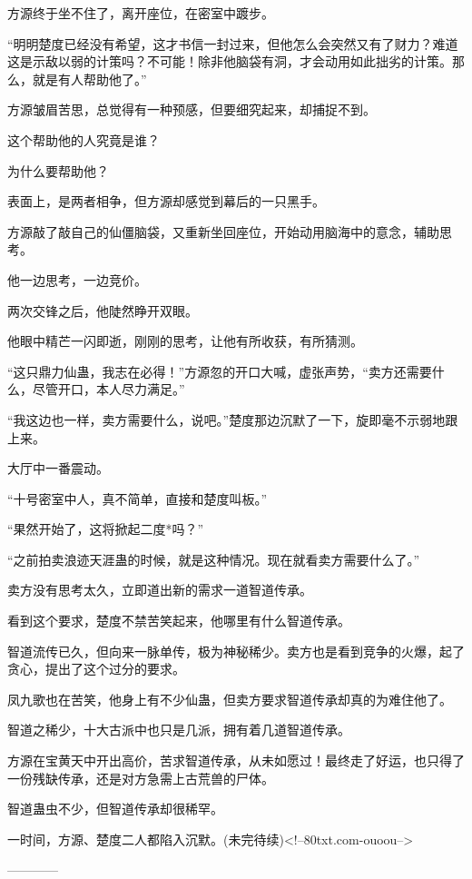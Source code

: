 \begin{this_body}
方源终于坐不住了，离开座位，在密室中踱步。

“明明楚度已经没有希望，这才书信一封过来，但他怎么会突然又有了财力？难道这是示敌以弱的计策吗？不可能！除非他脑袋有洞，才会动用如此拙劣的计策。那么，就是有人帮助他了。”

方源皱眉苦思，总觉得有一种预感，但要细究起来，却捕捉不到。

这个帮助他的人究竟是谁？

为什么要帮助他？

表面上，是两者相争，但方源却感觉到幕后的一只黑手。

方源敲了敲自己的仙僵脑袋，又重新坐回座位，开始动用脑海中的意念，辅助思考。

他一边思考，一边竞价。

两次交锋之后，他陡然睁开双眼。

他眼中精芒一闪即逝，刚刚的思考，让他有所收获，有所猜测。

“这只鼎力仙蛊，我志在必得！”方源忽的开口大喊，虚张声势，“卖方还需要什么，尽管开口，本人尽力满足。”

“我这边也一样，卖方需要什么，说吧。”楚度那边沉默了一下，旋即毫不示弱地跟上来。

大厅中一番震动。

“十号密室中人，真不简单，直接和楚度叫板。”

“果然开始了，这将掀起二度*吗？”

“之前拍卖浪迹天涯蛊的时候，就是这种情况。现在就看卖方需要什么了。”

卖方没有思考太久，立即道出新的需求一道智道传承。

看到这个要求，楚度不禁苦笑起来，他哪里有什么智道传承。

智道流传已久，但向来一脉单传，极为神秘稀少。卖方也是看到竞争的火爆，起了贪心，提出了这个过分的要求。

凤九歌也在苦笑，他身上有不少仙蛊，但卖方要求智道传承却真的为难住他了。

智道之稀少，十大古派中也只是几派，拥有着几道智道传承。

方源在宝黄天中开出高价，苦求智道传承，从未如愿过！最终走了好运，也只得了一份残缺传承，还是对方急需上古荒兽的尸体。

智道蛊虫不少，但智道传承却很稀罕。

一时间，方源、楚度二人都陷入沉默。(未完待续)<!--80txt.com-ouoou-->

------------

\end{this_body}

